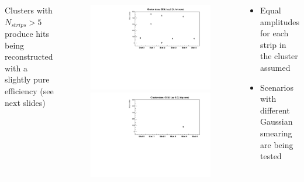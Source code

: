 \documentclass[dvipsnames] {beamer}
\begin{document}
\begin{frame}
\begin{columns}[t]
\begin{block}{}
              Clusters with $N_{strips} > 5$ produce hits being reconstructed with a slightly pure efficiency
              (see next slides)
            \end{block}
            \begin{block}{}
             \begin{figure}[H]
             \includegraphics[width=1.\linewidth]{EmbeddingClustersLay2.pdf}
             \includegraphics[width=1.\linewidth]{EmbeddingClustersLay0.pdf}
              \end{figure}
            \end{block}
            \vskip -0.3cm
            \begin{block}{}
              \tiny
              \begin{itemize}
              \item Equal amplitudes for each strip in the cluster assumed
              \item Scenarios with different Gaussian smearing are being tested 
              \end{itemize}
            \end{block}
          \end{columns}
       \end{frame}
\end{document}
